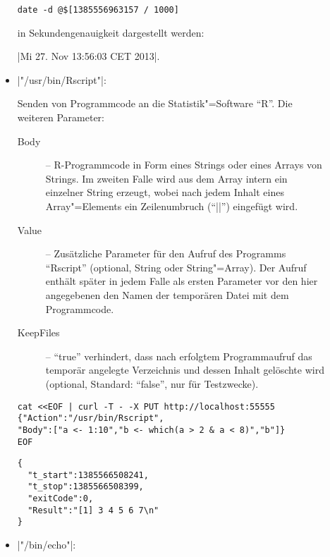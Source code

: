 \documentclass[%
fontsize=11pt
,paper=a4
,twoside
,headings=normal
,pagesize
]{scrartcl}
\begin{document}
\begin{description}
\begin{itemize}
\begin{lstlisting}[language={}]
date -d @$[1385556963157 / 1000]
\end{lstlisting}

      in Sekundengenauigkeit dargestellt werden: \par
      \quad |Mi 27. Nov 13:56:03 CET 2013|.

    \item |"/usr/bin/Rscript"|: \par

      Senden von Programmcode an die Statistik"=Software "`R"'. Die weiteren
      Parameter:
      \begin{description}

        \item[Body] -- R-Programmcode in Form eines Strings oder eines
        Arrays von Strings. Im zweiten Falle wird aus dem Array intern ein
        einzelner String erzeugt, wobei nach jedem Inhalt eines
        Array"=Elements ein Zeilenumbruch ("`|\n|"') eingefügt wird.

        \item[Value] -- Zusätzliche Parameter für den Aufruf des Programms
        "`Rscript"' (optional, String oder String"=Array). Der Aufruf
        enthält später in jedem Falle als ersten Parameter vor den hier
        angegebenen den Namen der temporären Datei mit dem Programmcode.

        \item[KeepFiles] -- "`true"' verhindert, dass nach erfolgtem
        Programmaufruf das temporär angelegte Verzeichnis und dessen Inhalt
        gelöschte wird (optional, Standard: "`false"', nur für Testzwecke).

      \end{description}
\enlargethispage{-2\baselineskip}
\begin{lstlisting}[language={},name=Beispiel:]
cat <<EOF | curl -T - -X PUT http://localhost:55555
{"Action":"/usr/bin/Rscript",
"Body":["a <- 1:10","b <- which(a > 2 & a < 8)","b"]}
EOF
\end{lstlisting}

\begin{lstlisting}[language={},name=Rückgabe:]
{
  "t_start":1385566508241,
  "t_stop":1385566508399,
  "exitCode":0,
  "Result":"[1] 3 4 5 6 7\n"
}
\end{lstlisting}

    \item |"/bin/echo"|: \par


\end{itemize}
\end{description}
\end{document}
